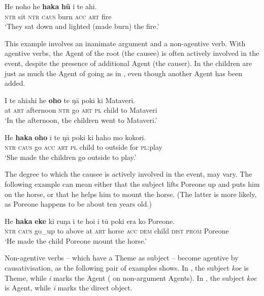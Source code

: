 \ea\label{ex:8.222}
\gll He noho he \textbf{haka} \textbf{hū} i te ahi. \\
\textsc{ntr} sit \textsc{ntr} \textsc{caus} burn \textsc{acc} \textsc{art} fire \\

\glt
‘They sat down and lighted (made burn) the fire.’ \textstyleExampleref{[R178.016]} 
\z

This example involves an inanimate argument and a non-agentive verb. With agentive verbs, the Agent of the root (the causee) is often actively involved in the event, despite the presence of additional Agent (the causer). In  the children are just as much the Agent of going as in , even though another Agent has been added.

\ea\label{ex:8.223}
\gll {\ꞌ}I te ahiahi he \textbf{oho} te ŋā poki ki Mataveri.\\
at \textsc{art} afternoon \textsc{ntr} go \textsc{art} \textsc{pl} child to Mataveri\\

\glt 
‘In the afternoon, the children went to Mataveri.’ \textstyleExampleref{[R159.015]} 
\z

\ea\label{ex:8.224}
\gll He \textbf{haka} \textbf{oho} i te ŋā poki ki haho mo kokori. \\
\textsc{ntr} \textsc{caus} go \textsc{acc} \textsc{art} \textsc{pl} child to outside for \textsc{pl}:play \\

\glt
‘She made the children go outside to play.’ \textstyleExampleref{[R236.013]} 
\z

The degree to which the causee is actively involved in the event, may vary. The following example can mean either that the subject lifts Poreone up and puts him on the horse, or that he helps him to mount the horse. (The latter is more likely, as Poreone happens to be about ten years old.)

\ea\label{ex:8.225}
\gll He \textbf{haka} \textbf{eke} ki ruŋa i te hoi i tū poki era ko Poreone. \\
\textsc{ntr} \textsc{caus} go\_up to above at \textsc{art} horse \textsc{acc} \textsc{dem} child \textsc{dist} \textsc{prom} Poreone \\

\glt 
‘He made the child Poreone mount the horse.’ \textstyleExampleref{[R105.095]} 
\z

Non-agentive verbs – which have a Theme as subject – become agentive by causativisation, as the following pair of examples shows. In , the subject \textit{koe} is Theme, while \textit{i} marks the Agent ( on non-argument Agents). In , the subject \textit{koe} is Agent, while \textit{i} marks the direct object.

